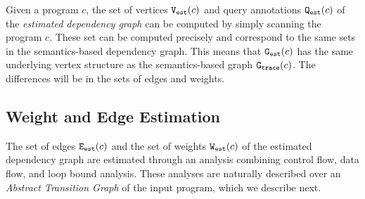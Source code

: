
%
%
%
Given a program $c$, the set of vertices $\mathtt{{V_{est}}}(c)$ and query annotations $\mathtt{{Q_{est}}}(c)$ of the \emph{estimated dependency graph} can be computed by simply
scanning the program $c$. These set can be computed precisely and correspond to
the same sets in the semantics-based dependency graph.
This means that $\mathtt{{G_{est}}}(c)$ has the same underlying vertex structure as 
the semantics-based graph $\mathtt{{G_{trace}}}(c)$. The differences will be in the sets of edges and weights. 



\subsection{Weight and Edge Estimation}
\label{sec:alg_weightedgegen}
The set of edges $\mathtt{{E_{est}}}(c)$ and the set of weights $\mathtt{{W_{est}}}(c)$ of the estimated dependency graph are estimated through an analysis combining control flow, data flow, and loop bound analysis. These analyses are naturally described over an  \emph{Abstract Transition Graph} of the input program, which we describe next.
%
%
